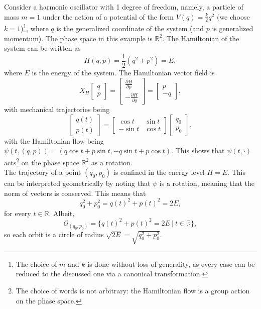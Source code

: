 \documentclass[12pt]{article}
\theoremstyle{plain}
\newcommand{\R}{\mathbb{R}}
\begin{document}
Consider a harmonic oscillator with 1 degree of freedom, namely, a particle of mass $m = 1$ under the action of a potential of the form $V(q) = \frac{k}{2}q^2$ (we choose $k = 1$)\footnote{The choice of $m$ and $k$ is done without loss of generality, as every case can be reduced to the discussed one via a canonical transformation.}, where $q$ is the generalized coordinate of the system (and $p$ is generalized momentum). The phase space in this example is $\R^2$. The Hamiltonian of the system can be written as 
$$H(q,p) = \frac{1}{2}\left(q^2 + p^2\right) = E,$$ where $E$ is the energy of the system. The Hamiltonian vector field is 
$$X_H \begin{bmatrix}
    q\\
    p
\end{bmatrix} = \begin{bmatrix}
    \frac{\partial H}{\partial p}\\
    -\frac{\partial H}{\partial q}
\end{bmatrix} = \begin{bmatrix}
    p\\
    -q
\end{bmatrix},$$ with mechanical trajectories being $$\begin{bmatrix}
    q(t)\\
    p(t)
\end{bmatrix} = \begin{bmatrix}
    \cos t & \sin t\\
    -\sin t & \cos t
\end{bmatrix}\begin{bmatrix}
    q_0\\
    p_0
\end{bmatrix},$$ with the Hamiltonian flow being $\psi(t,(q,p)) = \left(q\cos t + p\sin t, -q\sin t + p\cos t\right)$. This shows that $\psi(t,\cdot)$ acts\footnote{The choice of words is not arbitrary: the Hamiltonian flow is a group action on the phase space.} on the phase space $\R^2$ as a rotation.\\

The trajectory of a point $(q_0,p_0)$ is confined in the energy level $H = E$. This can be interpreted geometrically by noting that $\psi$ is a rotation, meaning that the norm of vectors is conserved. This means that $$q_0^2 + p_0^2 = q(t)^2 + p(t)^2 = 2E,$$ for every $t\in \R$. Albeit, $$\mathcal{O}_{(q_0,p_0)} = \{q(t)^2 + p(t)^2 = 2E\ |\ t\in\R\},$$ so each orbit is a circle of radius $\sqrt{2E} = \sqrt{q_0^2 + p_0^2}$.\\
\end{document}
